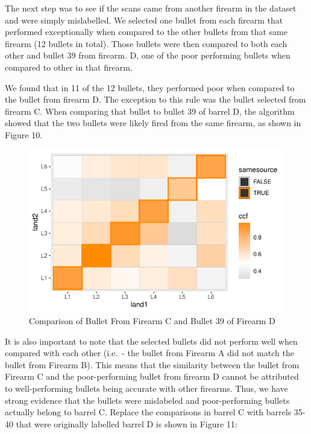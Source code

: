 \documentclass[
  number]{elsarticle}
\begin{document}
The next step was to see if the scans came from another firearm in the
dataset and were simply mislabelled. We selected one bullet from each
firearm that performed exceptionally when compared to the other bullets
from that same firearm (12 bullets in total). Those bullets were then
compared to both each other and bullet 39 from firearm. D, one of the
poor performing bullets when compared to other in that firearm.

We found that in 11 of the 12 bullets, they performed poor when compared
to the bullet from firearm D. The exception to this rule was the bullet
selected from firearm C. When comparing that bullet to bullet 39 of
barrel D, the algorithm showed that the two bullets were likely fired
from the same firearm, as shown in Figure 10.

\begin{figure}[H]

{\centering \includegraphics{Interactive-Visualization-Framework_files/figure-pdf/unnamed-chunk-7-1.pdf}

}

\caption{Comparison of Bullet From Firearm C and Bullet 39 of Firearm D}

\end{figure}

It is also important to note that the selected bullets did not perform
well when compared with each other (i.e.~- the bullet from Firearm A did
not match the bullet from Firearm B). This means that the similarity
between the bullet from Firearm C and the poor-performing bullet from
firearm D cannot be attributed to well-performing bullets being accurate
with other firearms. Thus, we have strong evidence that the bullets were
mislabeled and poor-performing bullets actually belong to barrel C.
Replace the comparisons in barrel C with barrels 35-40 that were
originally labelled barrel D is shown in Figure 11:
\end{document}
